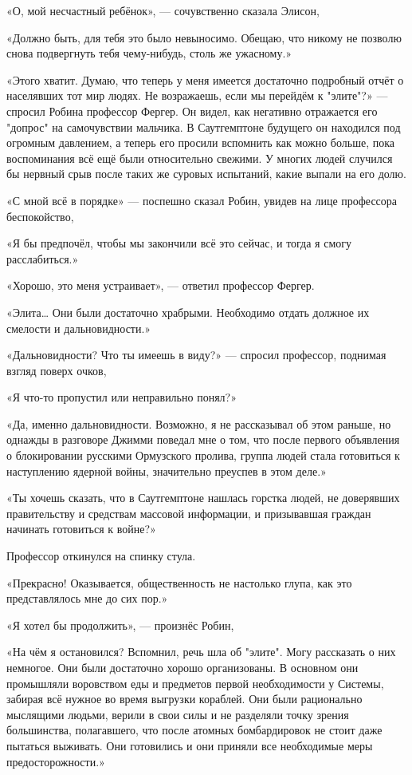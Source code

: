 \documentclass[a5paper, 9pt,
final, openany, twoside=true]{memoir}
\begin{document}
«О, мой несчастный ребёнок», — сочувственно сказала Элисон,

«Должно быть, для тебя это было невыносимо. Обещаю, что никому не позволю снова подвергнуть тебя чему-нибудь, столь же ужасному.»

«Этого хватит. Думаю, что теперь у меня имеется достаточно подробный отчёт о населявших тот мир людях. Не возражаешь, если мы перейдём к "элите"?» — спросил Робина профессор Фергер. Он видел, как негативно отражается его "допрос" на самочувствии мальчика. В Саутгемптоне будущего он находился под огромным давлением, а теперь его просили вспомнить как можно больше, пока воспоминания всё ещё были относительно свежими. У многих людей случился бы нервный срыв после таких же суровых испытаний, какие выпали на его долю.

«С мной всё в порядке» — поспешно сказал Робин, увидев на лице профессора беспокойство,

«Я бы предпочёл, чтобы мы закончили всё это сейчас, и тогда я смогу расслабиться.»

«Хорошо, это меня устраивает», — ответил профессор Фергер.

«Элита… Они были достаточно храбрыми. Необходимо отдать должное их смелости и дальновидности.»

«Дальновидности? Что ты имеешь в виду?» — спросил профессор, поднимая взгляд поверх очков,

«Я что-то пропустил или неправильно понял?»

«Да, именно дальновидности. Возможно, я не рассказывал об этом раньше, но однажды в разговоре Джимми поведал мне о том, что после первого объявления о блокировании русскими Ормузского пролива, группа людей стала готовиться к наступлению ядерной войны, значительно преуспев в этом деле.»

«Ты хочешь сказать, что в Саутгемптоне нашлась горстка людей, не доверявших правительству и средствам массовой информации, и призывавшая граждан начинать готовиться к войне?»

Профессор откинулся на спинку стула.

«Прекрасно! Оказывается, общественность не настолько глупа, как это представлялось мне до сих пор.»

«Я хотел бы продолжить», — произнёс Робин,

«На чём я остановился? Вспомнил, речь шла об "элите". Могу рассказать о них немногое. Они были достаточно хорошо организованы. В основном они промышляли воровством еды и предметов первой необходимости у Системы, забирая всё нужное во время выгрузки кораблей. Они были рационально мыслящими людьми, верили в свои силы и не разделяли точку зрения большинства, полагавшего, что после атомных бомбардировок не стоит даже пытаться выживать. Они готовились и они приняли все необходимые меры предосторожности.»\bigskip
\end{document}
